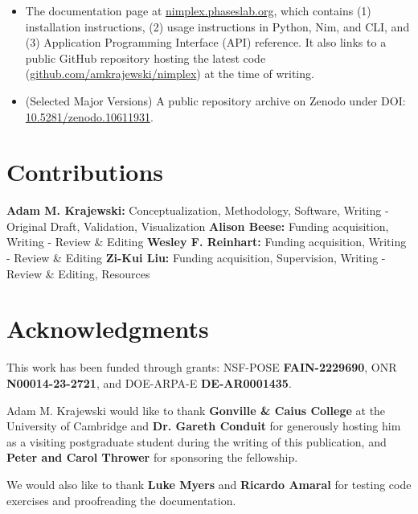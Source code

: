 \begin{itemize}
    \item The documentation page at \href{https://nimplex.phaseslab.org}{nimplex.phaseslab.org}, which contains (1) installation instructions, (2) usage instructions in Python, Nim, and CLI, and (3) Application Programming Interface (API) reference. It also links to a public GitHub repository hosting the latest code (\href{https://github.com/amkrajewski/nimplex}{github.com/amkrajewski/nimplex}) at the time of writing.


    \item (Selected Major Versions) A public repository archive on Zenodo under DOI: \href{https://doi.org/10.5281/zenodo.10611931}{10.5281/zenodo.10611931}.
\end{itemize}

\section*{Contributions}
\textbf{Adam M. Krajewski:} Conceptualization, Methodology, Software, Writing - Original Draft, Validation, Visualization
\textbf{Alison Beese:} Funding acquisition, Writing - Review \& Editing
\textbf{Wesley F. Reinhart:} Funding acquisition, Writing - Review \& Editing
\textbf{Zi-Kui Liu:} Funding acquisition, Supervision, Writing - Review \& Editing, Resources

\section*{Acknowledgments}

This work has been funded through grants: NSF-POSE \textbf{FAIN-2229690}, ONR \textbf{N00014-23-2721}, and DOE-ARPA-E \textbf{DE-AR0001435}. 

Adam M. Krajewski would like to thank \textbf{Gonville \& Caius College} at the University of Cambridge and \textbf{Dr. Gareth Conduit} for generously hosting him as a visiting postgraduate student during the writing of this publication, and \textbf{Peter and Carol Thrower} for sponsoring the fellowship.

We would also like to thank \textbf{Luke Myers} and \textbf{Ricardo Amaral} for testing code exercises and proofreading the documentation.

